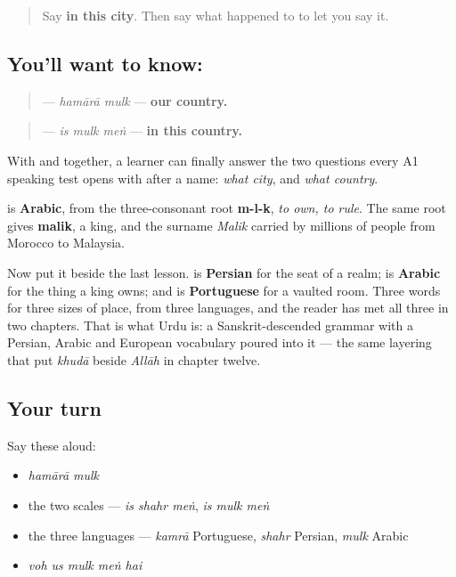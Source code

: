 \label{lesson:UR-C27-mulk}



\begin{quote}
Say \textbf{in this city}. Then say what happened to \textbf{} to let you say it.
\end{quote}

\subsection*{You'll want to know: }
\begin{quote}
\textbf{ } — \emph{hamārā mulk} — \textbf{our country.}
\end{quote}

\begin{quote}
\textbf{  } — \emph{is mulk meṅ} — \textbf{in this country.}
\end{quote}

With \textbf{} and \textbf{} together, a learner can finally answer the two questions every A1 speaking test opens with after a name: \emph{what city}, and \emph{what country}.

\begin{cousinweb}
\textbf{} is \textbf{Arabic}, from the three-consonant root \textbf{m-l-k}, \emph{to own, to rule}. The same root gives \textbf{malik}, a king, and the surname \emph{Malik} carried by millions of people from Morocco to Malaysia.

Now put it beside the last lesson. \textbf{} is \textbf{Persian} for the seat of a realm; \textbf{} is \textbf{Arabic} for the thing a king owns; and \textbf{} is \textbf{Portuguese} for a vaulted room. Three words for three sizes of place, from three languages, and the reader has met all three in two chapters. That is what Urdu is: a Sanskrit-descended grammar with a Persian, Arabic and European vocabulary poured into it — the same layering that put \emph{khudā} beside \emph{Allāh} in chapter twelve.
\end{cousinweb}

\subsection*{Your turn}
Say these aloud:

\begin{itemize}
\raggedright
  \item \emph{hamārā mulk}
  \item the two scales — \emph{is shahr meṅ}, \emph{is mulk meṅ}
  \item the three languages — \emph{kamrā} Portuguese, \emph{shahr} Persian, \emph{mulk} Arabic
  \item \emph{voh us mulk meṅ hai}
\end{itemize}

